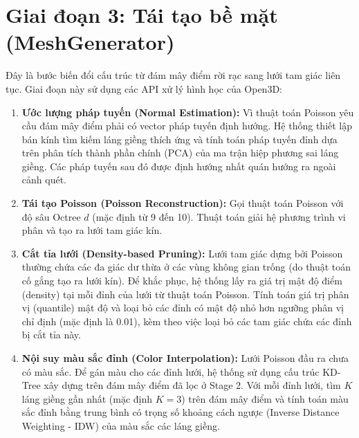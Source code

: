 \documentclass[a4paper,12pt]{report}
\begin{document}
\section{Giai đoạn 3: Tái tạo bề mặt (MeshGenerator)}
Đây là bước biến đổi cấu trúc từ đám mây điểm rời rạc sang lưới tam giác liên tục. Giai đoạn này sử dụng các API xử lý hình học của Open3D:
\begin{enumerate}
    \item \textbf{Ước lượng pháp tuyến (Normal Estimation):} Vì thuật toán Poisson yêu cầu đám mây điểm phải có vector pháp tuyến định hướng. Hệ thống thiết lập bán kính tìm kiếm láng giềng thích ứng và tính toán pháp tuyến đỉnh dựa trên phân tích thành phần chính (PCA) của ma trận hiệp phương sai láng giềng. Các pháp tuyến sau đó được định hướng nhất quán hướng ra ngoài cảnh quét.
    \item \textbf{Tái tạo Poisson (Poisson Reconstruction):} Gọi thuật toán Poisson với độ sâu Octree $d$ (mặc định từ 9 đến 10). Thuật toán giải hệ phương trình vi phân và tạo ra lưới tam giác kín.
    \item \textbf{Cắt tỉa lưới (Density-based Pruning):} Lưới tam giác dựng bởi Poisson thường chứa các đa giác dư thừa ở các vùng không gian trống (do thuật toán cố gắng tạo ra lưới kín). Để khắc phục, hệ thống lấy ra giá trị mật độ điểm (density) tại mỗi đỉnh của lưới từ thuật toán Poisson. Tính toán giá trị phân vị (quantile) mật độ và loại bỏ các đỉnh có mật độ nhỏ hơn ngưỡng phân vị chỉ định (mặc định là 0.01), kèm theo việc loại bỏ các tam giác chứa các đỉnh bị cắt tỉa này.
    \item \textbf{Nội suy màu sắc đỉnh (Color Interpolation):} Lưới Poisson đầu ra chưa có màu sắc. Để gán màu cho các đỉnh lưới, hệ thống sử dụng cấu trúc KD-Tree xây dựng trên đám mây điểm đã lọc ở Stage 2. Với mỗi đỉnh lưới, tìm $K$ láng giềng gần nhất (mặc định $K=3$) trên đám mây điểm và tính toán màu sắc đỉnh bằng trung bình có trọng số khoảng cách ngược (Inverse Distance Weighting - IDW) của màu sắc các láng giềng.
\end{enumerate}
\end{document}
